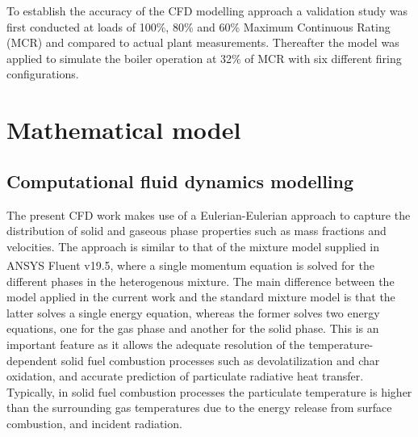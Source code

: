 \documentclass[twocolumn,10pt]{asme2ej}
\begin{document}
To establish the accuracy of the CFD modelling approach a validation study was first conducted at loads of 100\%, 80\% and 60\% Maximum Continuous Rating (MCR) and compared to actual plant measurements. Thereafter the model was applied to simulate the boiler operation at 32\% of MCR with six different firing configurations.

\section{Mathematical model}
\subsection{Computational fluid dynamics modelling}
The present CFD work makes use of a Eulerian-Eulerian approach to capture the distribution of solid and gaseous phase properties such as mass fractions and velocities. The approach is similar to that of the mixture model supplied in ANSYS Fluent v19.5\textsuperscript{\textregistered}, where a single momentum equation is solved for the different phases in the heterogenous mixture. The main difference between the model applied in the current work and the standard mixture model is that the latter solves a single energy equation, whereas the former solves two energy equations, one for the gas phase and another for the solid phase. This is an important feature as it allows the adequate resolution of the temperature-dependent solid fuel combustion processes such as devolatilization and char oxidation, and accurate prediction of particulate radiative heat transfer. Typically, in solid fuel combustion processes the particulate temperature is higher than the surrounding gas temperatures due to the energy release from surface combustion, and incident radiation.
\end{document}
